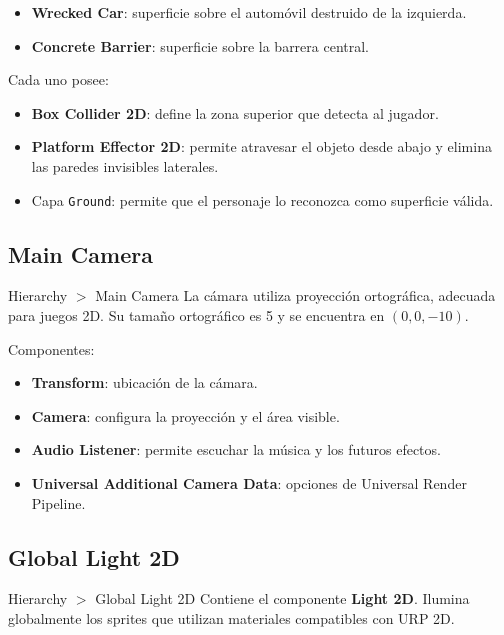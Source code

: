 \documentclass[11pt,a4paper]{article}
\newcommand{\component}[1]{\textbf{\textcolor{metalBlue}{#1}}}
\begin{document}
\begin{itemize}
  \item \textbf{Wrecked Car}: superficie sobre el automóvil destruido de la izquierda.
  \item \textbf{Concrete Barrier}: superficie sobre la barrera central.
\end{itemize}

Cada uno posee:

\begin{itemize}
  \item \component{Box Collider 2D}: define la zona superior que detecta al jugador.
  \item \component{Platform Effector 2D}: permite atravesar el objeto desde abajo y elimina las paredes invisibles laterales.
  \item Capa \texttt{Ground}: permite que el personaje lo reconozca como superficie válida.
\end{itemize}

\subsection{Main Camera}

\begin{unitybox}{Hierarchy $>$ Main Camera}
La cámara utiliza proyección ortográfica, adecuada para juegos 2D. Su tamaño ortográfico es 5 y se encuentra en $(0,0,-10)$.
\end{unitybox}

Componentes:

\begin{itemize}
  \item \component{Transform}: ubicación de la cámara.
  \item \component{Camera}: configura la proyección y el área visible.
  \item \component{Audio Listener}: permite escuchar la música y los futuros efectos.
  \item \component{Universal Additional Camera Data}: opciones de Universal Render Pipeline.
\end{itemize}

\subsection{Global Light 2D}

\begin{unitybox}{Hierarchy $>$ Global Light 2D}
Contiene el componente \component{Light 2D}. Ilumina globalmente los sprites que utilizan materiales compatibles con URP 2D.
\end{unitybox}
\end{document}
